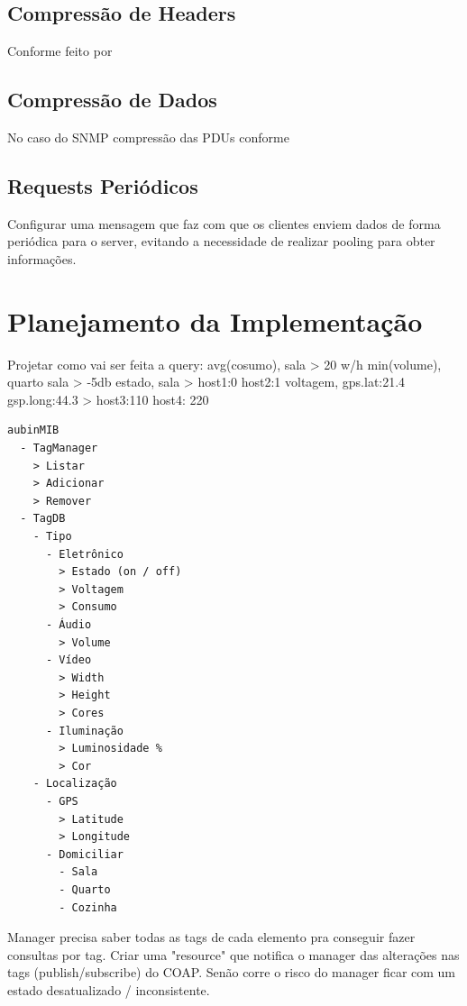\documentclass[twoside,english,brazilian]{UNISINOSmonografia}
\begin{document}
		
	\section{Compressão de Headers}
		
		Conforme feito por \cite{Choi2009}
		
		
	\section{Compressão de Dados}
		
		No caso do SNMP compressão das PDUs conforme \cite{Choi2009}
		
		
	\section{Requests Periódicos}
		
		Configurar uma mensagem que faz com que os clientes enviem
		dados de forma periódica para o server, evitando a necessidade
		de realizar pooling para obter informações.
		\cite{Choi2009}
		
		
\chapter{Planejamento da Implementação}

Projetar como vai ser feita a query:
avg(cosumo), 	sala 						> 20 w/h
min(volume), 	quarto sala 				> -5db
estado, 		sala 						> host1:0 host2:1
voltagem, 		gps.lat:21.4 gsp.long:44.3 	> host3:110 host4: 220


\begin{verbatim}
aubinMIB
  - TagManager
    > Listar
    > Adicionar
    > Remover
  - TagDB
    - Tipo
      - Eletrônico
        > Estado (on / off)
        > Voltagem
        > Consumo
      - Áudio
        > Volume
      - Vídeo
        > Width
        > Height
        > Cores
      - Iluminação
        > Luminosidade %
        > Cor
    - Localização
      - GPS
        > Latitude
        > Longitude
      - Domiciliar
        - Sala
        - Quarto
        - Cozinha
\end{verbatim}

Manager precisa saber todas as tags de cada elemento pra conseguir fazer 
consultas por tag. Criar uma "resource" que notifica o manager das alterações 
nas tags (publish/subscribe) do COAP. Senão corre o risco do manager ficar com 
um estado desatualizado / inconsistente.
\end{document}
